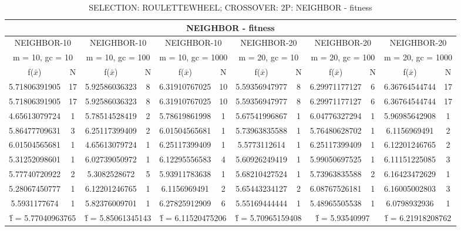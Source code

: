 \begin{table}[H]
	\centering
	\caption{SELECTION: ROULETTEWHEEL; CROSSOVER: 2P: NEIGHBOR - fitness}
	\begin{adjustbox}{width=1\textwidth}
		\begin{tabular}{ |c|c||c|c||c|c||c|c||c|c||c|c| }
			\hline
			\multicolumn{12}{|c|}{NEIGHBOR - fitness} \\
			\hline
			\multicolumn{2}{|c||}{NEIGHBOR-10} & \multicolumn{2}{c||}{NEIGHBOR-10} & \multicolumn{2}{c||}{NEIGHBOR-10} & \multicolumn{2}{c||}{NEIGHBOR-20} & \multicolumn{2}{c||}{NEIGHBOR-20} & \multicolumn{2}{c|}{NEIGHBOR-20}\\
			\hline
			\multicolumn{2}{|c||}{m = 10, gc = 10} & \multicolumn{2}{c||}{m = 10, gc = 100} & \multicolumn{2}{c||}{m = 10, gc = 1000} & \multicolumn{2}{c||}{m = 20, gc = 10} & \multicolumn{2}{c||}{m = 20, gc = 100} & \multicolumn{2}{c|}{m = 20, gc = 1000}\\
			\hline
			f($\bar{x}$) & N & f($\bar{x}$) & N & f($\bar{x}$) & N & f($\bar{x}$) & N & f($\bar{x}$) & N & f($\bar{x}$) & N\\
			\hline
			\hline
			5.71806391905 & 17 & 5.92586036323 & 8 & 6.31910767025 & 10 & 5.59356947977 & 8 & 6.29971177127 & 6 & 6.36764544744 & 17\\
			\hline
			5.71806391905 & 17 & 5.92586036323 & 8 & 6.31910767025 & 10 & 5.59356947977 & 8 & 6.29971177127 & 6 & 6.36764544744 & 17\\
			4.65613079724 & 1 & 5.78514528419 & 2 & 5.78619861998 & 1 & 5.67541996867 & 1 & 6.04776327294 & 1 & 5.96985642908 & 1\\
			5.86477709631 & 3 & 6.25117399409 & 2 & 6.01504565681 & 1 & 5.73963835588 & 1 & 5.76480628702 & 1 & 6.1156969491 & 2\\
			6.01504565681 & 1 & 4.65613079724 & 1 & 6.25117399409 & 1 & 5.5773112614 & 1 & 6.25117399409 & 1 & 6.12201246765 & 2\\
			5.31252098601 & 1 & 6.02739050972 & 1 & 6.12295556583 & 4 & 5.60926249419 & 1 & 5.99050697525 & 1 & 6.11151225085 & 3\\
			5.77740720922 & 2 & 5.3082528672 & 5 & 5.93911783638 & 1 & 5.68210427524 & 1 & 5.73963835588 & 2 & 6.16423472629 & 1\\
			5.28067450777 & 1 & 6.12201246765 & 1 & 6.1156969491 & 2 & 5.65443234127 & 2 & 6.08767526181 & 1 & 6.16005002803 & 3\\
			5.5931177674 & 1 & 5.82376009701 & 1 & 6.27825912909 & 6 & 5.55169444444 & 1 & 5.48965505538 & 1 & 6.0798932936 & 1\\
			\hline
			\multicolumn{2}{|c||}{\^{f} = 5.77040963765} & \multicolumn{2}{c||}{\^{f} = 5.85061345143} & \multicolumn{2}{c||}{\^{f} = 6.11520475206} & \multicolumn{2}{c||}{\^{f} = 5.70965159408} & \multicolumn{2}{c||}{\^{f} = 5.93540997} & \multicolumn{2}{c|}{\^{f} = 6.21918208762}\\
			\hline
		\end{tabular}
	\end{adjustbox}
\end{table}
